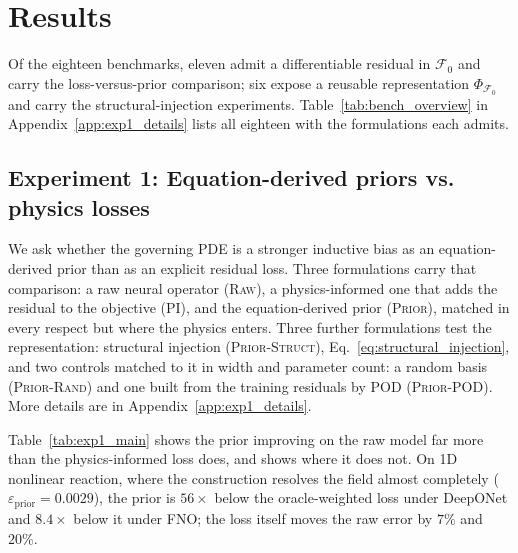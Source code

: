 \documentclass{article}
\newcommand{\armraw}{\textsc{Raw}}
\newcommand{\armpi}{\textsc{PI}}
\newcommand{\armprior}{\textsc{Prior}}
\newcommand{\armstruct}{\textsc{Prior-Struct}}
\newcommand{\armrand}{\textsc{Prior-Rand}}
\newcommand{\armpod}{\textsc{Prior-POD}}
\begin{document}
\section{Results}
\label{sec:results}
\vspace{-3mm}
Of the eighteen benchmarks, eleven admit a differentiable residual in
$\mathcal{F}_0$ and carry the loss-versus-prior comparison; six expose a reusable
representation $\Phi_{\mathcal{F}_0}$ and carry the structural-injection
experiments. Table~\ref{tab:bench_overview} in Appendix~\ref{app:exp1_details}
lists all eighteen with the formulations each admits.

 \subsection{Experiment 1: Equation-derived priors vs. physics losses}
\label{sec:exp1}

We ask whether the governing PDE is a stronger inductive bias as an equation-derived
prior than as an explicit residual loss. Three formulations carry that comparison:
a raw neural operator (\armraw), a physics-informed one that adds the residual to the
objective (\armpi), and the equation-derived prior (\armprior), matched in every
respect but where the physics enters. Three further formulations test the representation:
structural injection (\armstruct), Eq.~\ref{eq:structural_injection}, and two controls matched
to it in width and parameter count: a random basis (\armrand) and one built from the training
residuals by POD (\armpod).
More details are in Appendix~\ref{app:exp1_details}.


Table~\ref{tab:exp1_main} shows the prior improving on the raw model far more than the
physics-informed loss does, and shows where it does not. On 1D nonlinear reaction, where the
construction resolves the field almost completely ($\varepsilon_{\mathrm{prior}}=0.0029$), the
prior is $56\times$ below the oracle-weighted loss under DeepONet and $8.4\times$ below it under
\textsc{FNO}; the loss itself moves the raw error by $7\%$ and $20\%$.
\end{document}
